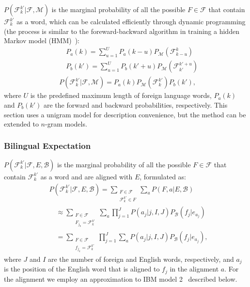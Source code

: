 \documentclass[11pt]{article}
\begin{document}
$P(\mathcal{F}_k^{k'}|\mathcal{F},\mathcal{M})$ is the marginal probability of all the possible $F \in \mathcal{F}$ that contain $\mathcal{F}_k^{k'}$ as a word, 
which can be calculated efficiently through dynamic programming (the process is similar to the foreward-backward algorithm in training a hidden Markov model (HMM)~\cite{rabiner1989tutorial}):
\begin{align}
&\quad P_a(k) =\sum_{u=1}^U P_a(k-u) P_\mathcal{M}(\mathcal{F}_{k-u}^k) \nonumber \\
&\quad P_b(k') =\sum_{u=1}^U P_b(k'+u) P_\mathcal{M}(\mathcal{F}_{k'}^{k'+u}) \nonumber \\
&P(\mathcal{F}_k^{k'}|\mathcal{F},\mathcal{M})  =  P_a(k) P_\mathcal{M}(\mathcal{F}_k^{k'}) P_b(k'), \label{eq:mono:dp} 
\end{align}
where $U$ is the predefined maximum length of foreign language words, $P_a(k)$ and $P_b(k')$ are the forward and backward probabilities, respectively. 
This section uses a unigram model for description convenience, but the method can be extended to $n$-gram models.

\subsubsection{Bilingual Expectation}

$P(\mathcal{F}_k^{k'}|\mathcal{F},E,\mathcal{B})$  is the marginal probability of all the possible $F \in \mathcal{F}$ that contain $\mathcal{F}_k^{k'}$ as a word and are aligned with $E$, formulated as:
\begin{align}
&P(\mathcal{F}_k^{k'}|\mathcal{F},E,\mathcal{B})=\sum_{\substack{F\in \mathcal{F}\\  \mathcal{F}_k^{k'} \in F} }\sum_a P(F,a|E,\mathcal{B})  \nonumber \\
&\quad \approx  \sum_{\substack{F\in \mathcal{F}\\F_{j_k} = \mathcal{F}_k^{k'}} } \sum_a \prod_{j=1}^{J}P(a_j|j,I,J)P_\mathcal{B}(f_j|e_{a_j}) \nonumber \\
&\quad= \sum_{\substack{F\in \mathcal{F}\\f_{j_k} = \mathcal{F}_k^{k'}} } \prod_{j=1}^{J} \sum_a P(a_j|j,I,J)P_\mathcal{B}(f_j|e_{a_j}), \label{eq:biling:expectation}
\end{align}
where $J$ and $I$ are the number of foreign and English words, respectively, and $a_j$ is the position of the English word that is aligned to $f_j$ in the alignment $a$.  For the alignment we employ an approximation to IBM model 2~\cite{brown1993mathematics,och03:asc} described below.
\end{document}
